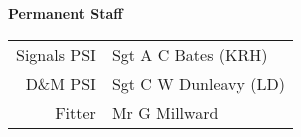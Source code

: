\begin{center}
  \Large
  \textbf{Permanent Staff}
\end{center}

\begin{center}
  \small
  \begin{tabular}{rl}
    Signals PSI & Sgt A C Bates (KRH) \\
    D\&M PSI & Sgt C W Dunleavy (LD) \\
    Fitter & Mr G Millward \\
  \end{tabular}
\end{center}
